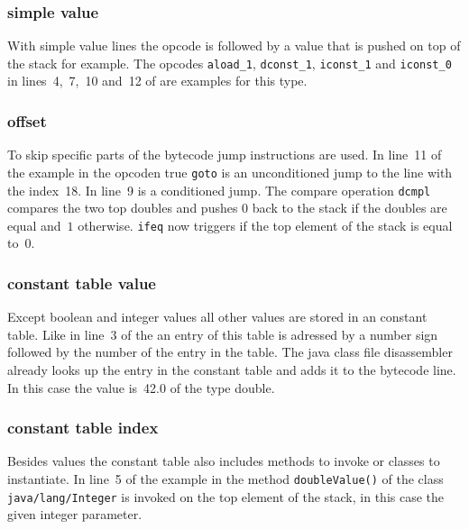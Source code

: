 \documentclass[conference]{IEEEtran}
\begin{document}
\subsubsection{simple value}
\label{sec:impl_disa_simple_value}

With simple value lines the opcode is followed by a value that is pushed on
top of the stack for example. The opcodes \texttt{aload\_1},
\texttt{dconst\_1}, \texttt{iconst\_1} and \texttt{iconst\_0} in
lines~4,~7,~10 and~12 of  are examples
for this type.

\subsubsection{offset}
\label{sec:impl_disa_offset}

To skip specific parts of the bytecode jump instructions are used. In line~11
of the example in  the opcoden true
\texttt{goto} is an unconditioned jump to the line with the index~18. In line~9
is a conditioned jump. The compare operation \texttt{dcmpl} compares the two
top doubles and pushes $0$ back to the stack if the doubles are equal and~$1$
otherwise. \texttt{ifeq} now triggers if the top element of the stack is equal
to~$0$.

\subsubsection{constant table value}
\label{sec:impl_disa_constant_table_value}

Except boolean and integer values all other values are stored in an constant
table. Like in line~3 of the  an entry of
this table is adressed by a number sign followed by the number of the entry in
the table. The java class file disassembler already looks up the entry in the
constant table and adds it to the bytecode line. In this case the value
is~42.0 of the type double.

\subsubsection{constant table index}
\label{sec:impl_disa_constant_table_index}

Besides values the constant table also includes methods to invoke or classes
to instantiate. In line~5 of the example in
 the method \texttt{doubleValue()} of
the class \texttt{java/lang/Integer} is invoked on the top element of the
stack, in this case the given integer parameter.
\end{document}
